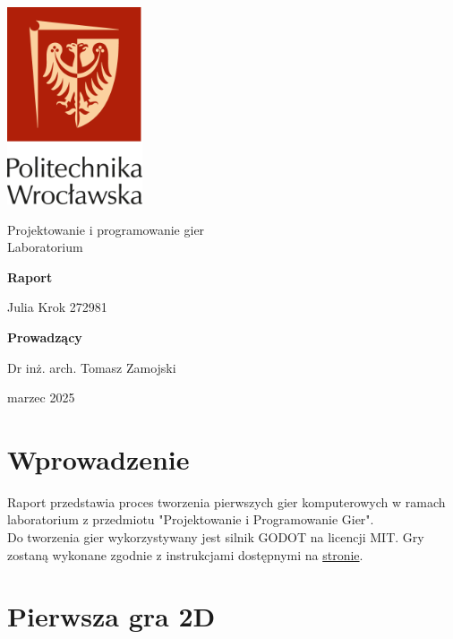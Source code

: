 \documentclass[a4paper,12pt]{article}
\begin{document}
\begin{titlepage}
    \centering
    \includegraphics[width=4cm]{logo PWr kolor pion bez tla.png}
    
    \vspace{1cm}
    {\huge Projektowanie i programowanie gier \\ Laboratorium \par}
    
    \vspace{2cm}
    {\huge\bfseries Raport\par}
    
    \vspace{2cm}
    {\Large Julia Krok 272981 \par}
    
    \vspace{2cm}
    \textbf{Prowadzący} \par
    \Large Dr inż. arch. Tomasz Zamojski
    
    \vspace{1.5cm}
    {\large marzec 2025 \par}
\end{titlepage}

\tableofcontents
\newpage
\section{Wprowadzenie}
Raport przedstawia proces tworzenia pierwszych gier komputerowych w ramach laboratorium z przedmiotu "Projektowanie i Programowanie Gier".
\\

Do tworzenia gier wykorzystywany jest silnik GODOT na licencji MIT. Gry zostaną wykonane zgodnie z instrukcjami dostępnymi na
\href{https://docs.godotengine.org/pl/4.x/getting_started}{stronie}.

\section{Pierwsza gra 2D}
\end{document}
